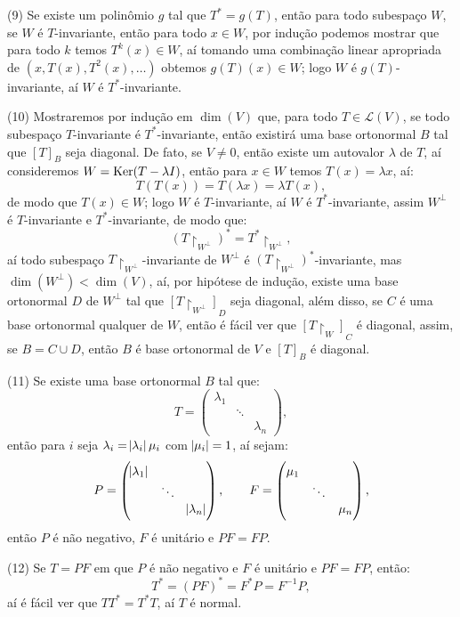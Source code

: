 \documentclass[11pt,a4paper]{article}
\begin{document}
{\bigskip
\noindent
(9) Se existe um polinômio $g$ tal que $T^*=g(T)$, então para todo subespaço $W$, se $W$ é $T$-invariante, então para todo $x\in W$, por indução podemos mostrar que para todo $k$ temos $T^k(x)\in W$, aí tomando uma combinação linear apropriada de $(x,T(x),T^2(x),\dots)$ obtemos $g(T)(x)\in W$; logo $W$ é $g(T)$-invariante, aí $W$ é $T^*$-invariante.

\bigskip
\noindent
(10) Mostraremos por indução em $\dim(V)$ que, para todo $T\in\mathcal{L}(V)$, se todo subespaço $T$-invariante é $T^*$-invariante, então existirá uma base ortonormal $B$ tal que $[T]_B$ seja diagonal. De fato, se $V\neq 0$, então existe um autovalor $\lambda$ de $T$, aí consideremos $W=\operatorname{Ker}(T-\lambda I)$, então para $x\in W$ temos $T(x)=\lambda x$, aí:
\[
T(T(x))=T(\lambda x)=\lambda T(x),
\]
de modo que $T(x)\in W$; logo $W$ é $T$-invariante, aí $W$ é $T^*$-invariante, assim $W^\perp$ é $T$-invariante e $T^*$-invariante, de modo que:
\[
(T\upharpoonright_{W^\perp})^*=T^*\upharpoonright_{W^\perp},
\]
aí todo subespaço $T\upharpoonright_{W^\perp}$-invariante de $W^\perp$ é $(T\upharpoonright_{W^\perp})^*$-invariante, mas $\dim(W^\perp)<\dim(V)$, aí, por hipótese de indução, existe uma base ortonormal $D$ de $W^\perp$ tal que $[T\upharpoonright_{W^\perp}]_D$ seja diagonal, além disso, se $C$ é uma base ortonormal qualquer de $W$, então é fácil ver que $[T\upharpoonright_W]_C$ é diagonal, assim, se $B=C\cup D$, então $B$ é base ortonormal de $V$ e $[T]_B$ é diagonal.

\bigskip
\noindent
(11) Se existe uma base ortonormal $B$ tal que:
\[
T=\begin{pmatrix}
\lambda_1&&\\&\ddots&\\&&\lambda_n
\end{pmatrix},
\]
então para $i$ seja $\lambda_i=\abs{\lambda_i}\mu_i$ com $\abs{\mu_i}=1$, aí sejam:
\[
P=\begin{pmatrix}
\abs{\lambda_1}&&\\&\ddots&\\&&\abs{\lambda_n}
\end{pmatrix},\quad\quad F=\begin{pmatrix}
\mu_1&&\\&\ddots&\\&&\mu_n
\end{pmatrix},
\]
então $P$ é não negativo, $F$ é unitário e $PF=FP$.

\bigskip
\noindent
(12) Se $T=PF$ em que $P$ é não negativo e $F$ é unitário e $PF=FP$, então:
\[
T^*=(PF)^*=F^*P=F^{-1}P,
\]
aí é fácil ver que $TT^*=T^*T$, aí $T$ é normal.

}
\end{document}
